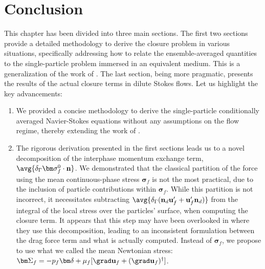 \section{Conclusion}
This chapter has been divided into three main sections. 
The first two sections provide a detailed methodology to derive the closure problem in various situations, specifically addressing how to relate the ensemble-averaged quantities to the single-particle problem immersed in an equivalent medium. 
This is a generalization of the work of \citet{hinch1977averaged}. 
The last section, being more pragmatic, presents the results of the actual closure terms in dilute Stokes flows. 
Let us highlight the key advancements:
\begin{enumerate}
    \item 
    We provided a concise methodology to derive the single-particle conditionally averaged Navier-Stokes equations without any assumptions on the flow regime, thereby extending the work of \citet{hinch1977averaged}. 
    \item The rigorous derivation presented in the first sections leads us to a novel decomposition of the interphase momentum exchange term, $\avg{\delta_\Gamma \bm\sigma_f^0 \cdot \textbf{n}}$. 
    We demonstrated that the classical partition of the force using the mean continuous-phase stress $\bm\sigma_f$ is not the most practical, due to the inclusion of particle contributions within $\bm\sigma_f$.
    While this partition is not incorrect, it necessitates subtracting $\avg{\delta_\Gamma (\textbf{n}_d \textbf{u}_f' + \textbf{u}_f' \textbf{n}_d)}$ from the integral of the local stress over the particles' surface, when computing the closure term. 
    It appears that this step may have been overlooked in \citet{wang2021numerical,wang2024effect} where they use this decomposition, leading to an inconsistent formulation between the drag force term and what is actually computed.
    Instead of $\bm\sigma_f$, we propose to use what we called the mean Newtonian stress: $\bm\Sigma_f = -p_f \bm\delta + \mu_f [\grad \textbf{u}_f + (\grad \textbf{u}_f)^\dagger]$. 

\end{enumerate}
